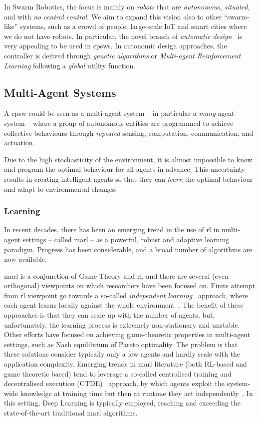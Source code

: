 \documentclass[11pt]{article}
\begin{document}
In Swarm Robotics, the focus is mainly on \textit{robots} that are \emph{autonomous}, \emph{situated}, and with \emph{no central control}. 
%
We aim to expand this vision also to other ``swarm-like'' systems, such as a crowd of people, large-scale IoT and smart cities where we do not have robots. 
%
In particular, the novel branch of \textit{automatic design}~\cite{DBLP:journals/firai/FrancescaB16} is very appealing to be used in \acp{cpsw}. 
%
In autonomic design approaches, the controller is derived through \textit{genetic algorithms} or \textit{Multi-agent Reinforcement Learning} following a \textit{global} utility function. 
\subsection{Multi-Agent Systems}
A \ac{cpsw} could be seen as a multi-agent system -- in particular a \emph{many}-agent system -- where a group of autonomous entities are programmed to achieve collective behaviours through \emph{repeated} sensing, computation, communication, and actuation.

Due to the high stochasticity of the environment, it is almost impossible to know and program the optimal behaviour for all agents in advance.
%
This uncertainty results in creating intelligent agents so that they can \emph{learn} the optimal behaviour and adapt to environmental changes.
\subsubsection{Learning}
In recent decades, there has been an emerging trend in the use of \ac{rl} 
in multi-agent settings -- called \ac{marl} -- as a powerful, robust and adaptive learning paradigm.
%
Progress has been considerable, and a broad number of algorithms are now available.

\ac{marl} is a conjunction of Game Theory and \ac{rl}, 
 and there are several (even orthogonal) viewpoints on which researchers have been focused on.
%
Firsts attempt from \ac{rl} viewpoint go towards a so-called \textit{independent learning}~\cite{DBLP:journals/tsmc/BusoniuBS08} approach, where each agent learns locally against the whole environment~\cite{DBLP:conf/icml/Tan93}.
%
The benefit of these approaches is that they can scale up with the number of agents, but, unfortunately, the learning process is extremely non-stationary and unstable.
%
Other efforts have focused on achieving game-theoretic properties in multi-agent settings, such as Nash equilibrium of Pareto optimality.
%
The problem is that these solutions consider typically only a few agents and hardly scale with the application complexity.
%
Emerging trends in \ac{marl} literature (both RL-based and game theoretic based) tend to leverage a so-called centralised training and decentralised execution (CTDE)~\cite{DBLP:journals/tcyb/NguyenNN20} approach, by which 
agents exploit the system-wide knowledge at training time but then at runtime they act independently~\cite{DBLP:journals/aamas/Hernandez-LealK19}. 
%
In this setting, Deep Learning is typically employed, reaching and exceeding the state-of-the-art traditional \ac{marl} algorithms.
 
\end{document}
